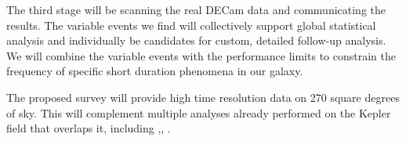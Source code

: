 \documentclass[11pt]{article}
\begin{document}
The third stage will be scanning the real DECam data and communicating the results. The variable events we find will collectively support global statistical analysis and individually be candidates for custom, detailed follow-up analysis. We will combine the variable events with the performance limits to constrain the frequency of specific short duration phenomena in our galaxy. 

% 



% 
% 
%

\otherfacilities

The proposed survey will provide high time resolution data on 270 square degrees of sky. This will complement multiple analyses already performed on the Kepler field that overlaps it, including ,, .
\end{document}

